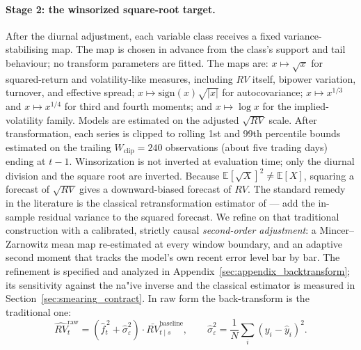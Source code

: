 \paragraph{Stage 2: the winsorized square-root target.}
After the diurnal adjustment, each variable class receives a fixed
variance-stabilising map. The map is chosen in advance from the class's
support and tail behaviour; no transform parameters are fitted. The maps
are: $x \mapsto \sqrt{x}$ for squared-return and volatility-like measures,
including $RV$ itself, bipower variation, turnover, and effective spread;
$x \mapsto \mathrm{sign}(x)\sqrt{|x|}$ for autocovariance;
$x \mapsto x^{1/3}$ and $x \mapsto x^{1/4}$ for third and fourth moments;
and $x \mapsto \log x$ for the implied-volatility family. Models are
estimated on the adjusted $\sqrt{RV}$ scale. After transformation, each
series is clipped to rolling 1st and 99th percentile bounds estimated on
the trailing $W_{\mathrm{clip}} = 240$ observations (about five trading
days) ending at $t-1$. Winsorization is not inverted at evaluation time;
only the diurnal division and the square root are inverted. Because
$\mathbb{E}[\sqrt{X}]^2 \neq \mathbb{E}[X]$, squaring a forecast of
$\sqrt{RV}$ gives a downward-biased forecast of $RV$. The standard
remedy in the literature is the classical retransformation estimator of
\citet{Duan1983} --- add the in-sample residual variance to the squared
forecast. We refine on that traditional construction with a calibrated,
strictly causal \emph{second-order adjustment}: a Mincer--Zarnowitz
mean map re-estimated at every window boundary, and an adaptive second
moment that tracks the model's own recent error level bar by bar. The
refinement is specified and analyzed in
Appendix~\ref{sec:appendix_backtransform}; its sensitivity against the
na"ive inverse and the classical estimator is measured in
Section~\ref{sec:smearing_contract}. In raw form the back-transform is
the traditional one:
\begin{equation}
    \widehat{RV}^{\mathrm{raw}}_t
    = \left(\hat{f}_t^{\,2} + \hat{\sigma}^2_{\varepsilon}\right)\cdot
      \bar{RV}^{\mathrm{baseline}}_{t\mid s},
    \qquad
    \hat{\sigma}^2_{\varepsilon} = \frac{1}{N}\sum_i (y_i - \hat{y}_i)^2.
    \label{eq:dp_duan}
\end{equation}

